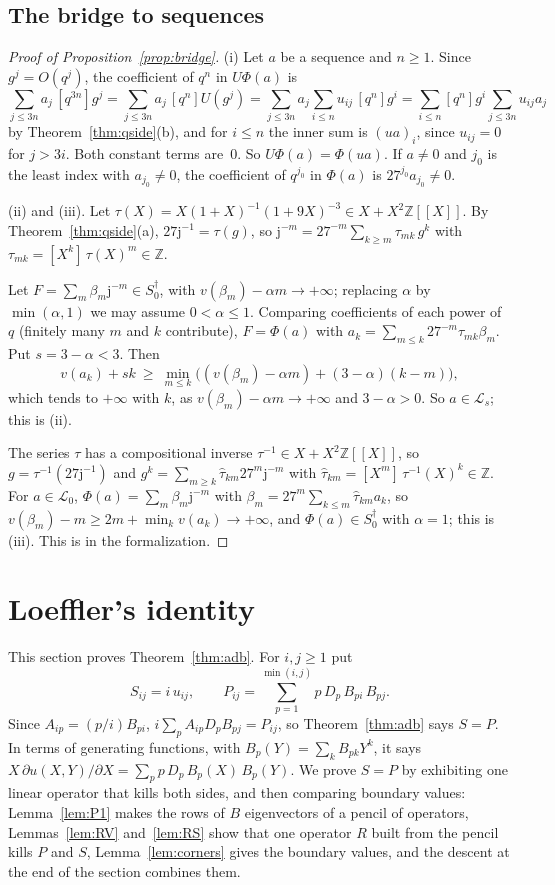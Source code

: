 \documentclass[11pt]{amsart}
\theoremstyle{definition}
\numberwithin{equation}{section}
\newcommand{\Z}{\mathbb{Z}}
\newcommand{\Sd}{S_0^{\dagger}}
\newcommand{\jj}{\mathrm{j}}
\newcommand{\jinv}{\jj^{-1}}
\newcommand{\cL}{\mathcal{L}}
\newcommand{\Lc}{\mathcal{L}_0}
\begin{document}
\subsection{The bridge to sequences}
\begin{proof}[Proof of Proposition~\textup{\ref{prop:bridge}}]
(i) Let $a$ be a sequence and $n\ge1$. Since $g^j=O(q^j)$, the coefficient of $q^n$ in $U\Phi(a)$ is
\[
\sum_{j\le3n}a_j\,[q^{3n}]g^j=\sum_{j\le3n}a_j\,[q^n]U(g^j)=\sum_{j\le3n}a_j\sum_{i\le n}u_{ij}\,[q^n]g^i=\sum_{i\le n}[q^n]g^i\sum_{j\le3n}u_{ij}a_j
\]
by Theorem~\ref{thm:qside}(b), and for $i\le n$ the inner sum is $(ua)_i$, since $u_{ij}=0$ for $j>3i$. Both constant terms are~$0$. So $U\Phi(a)=\Phi(ua)$. If $a\ne0$ and $j_0$ is the least index with $a_{j_0}\ne0$, the coefficient of $q^{j_0}$ in $\Phi(a)$ is $27^{j_0}a_{j_0}\ne0$.

(ii) and (iii). Let $\tau(X)=X(1+X)^{-1}(1+9X)^{-3}\in X+X^2\Z[[X]]$. By Theorem~\ref{thm:qside}(a), $27\jinv=\tau(g)$, so $\jj^{-m}=27^{-m}\sum_{k\ge m}\tau_{mk}\,g^k$ with $\tau_{mk}=[X^k]\,\tau(X)^m\in\Z$.

Let $F=\sum_m\beta_m\jj^{-m}\in\Sd$, with $v(\beta_m)-\alpha m\to+\infty$; replacing $\alpha$ by $\min(\alpha,1)$ we may assume $0<\alpha\le1$. Comparing coefficients of each power of $q$ (finitely many $m$ and $k$ contribute), $F=\Phi(a)$ with $a_k=\sum_{m\le k}27^{-m}\tau_{mk}\beta_m$. Put $s=3-\alpha<3$. Then
\[
v(a_k)+sk\ \ge\ \min_{m\le k}\bigl((v(\beta_m)-\alpha m)+(3-\alpha)(k-m)\bigr),
\]
which tends to $+\infty$ with $k$, as $v(\beta_m)-\alpha m\to+\infty$ and $3-\alpha>0$. So $a\in\cL_s$; this is (ii).

The series $\tau$ has a compositional inverse $\tau^{-1}\in X+X^2\Z[[X]]$, so $g=\tau^{-1}(27\jinv)$ and $g^k=\sum_{m\ge k}\hat\tau_{km}27^m\jj^{-m}$ with $\hat\tau_{km}=[X^m]\,\tau^{-1}(X)^k\in\Z$. For $a\in\Lc$, $\Phi(a)=\sum_m\beta_m\jj^{-m}$ with $\beta_m=27^m\sum_{k\le m}\hat\tau_{km}a_k$, so $v(\beta_m)-m\ge 2m+\min_kv(a_k)\to+\infty$, and $\Phi(a)\in\Sd$ with $\alpha=1$; this is (iii). This is  in the formalization.
\end{proof}

\section{Loeffler's identity}\label{sec:adb}

This section proves Theorem~\ref{thm:adb}. For $i,j\ge1$ put
\[
S_{ij}=i\,u_{ij},\qquad P_{ij}=\sum_{p=1}^{\min(i,j)}p\,D_p\,B_{pi}\,B_{pj}.
\]
Since $A_{ip}=(p/i)B_{pi}$, $i\sum_pA_{ip}D_pB_{pj}=P_{ij}$, so Theorem~\ref{thm:adb} says $S=P$. In terms of generating functions, with $B_p(Y)=\sum_kB_{pk}Y^k$, it says $X\,\partial u(X,Y)/\partial X=\sum_pp\,D_p\,B_p(X)\,B_p(Y)$. We prove $S=P$ by exhibiting one linear operator that kills both sides, and then comparing boundary values: Lemma~\ref{lem:P1} makes the rows of $B$ eigenvectors of a pencil of operators, Lemmas~\ref{lem:RV} and~\ref{lem:RS} show that one operator $R$ built from the pencil kills $P$ and $S$, Lemma~\ref{lem:corners} gives the boundary values, and the descent at the end of the section combines them.
\end{document}

